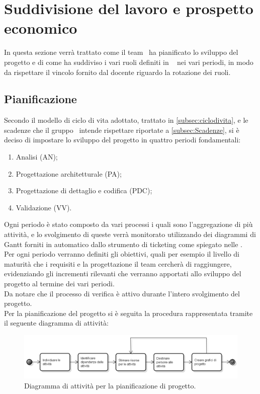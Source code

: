 \section{Suddivisione del lavoro e prospetto economico}
In questa sezione verrà trattato come il team \gruppo ~ha pianificato lo sviluppo del progetto e di come ha suddiviso i vari ruoli definiti in \NormeDiProgetto~ nei vari periodi, in modo da rispettare il vincolo fornito dal docente riguardo la rotazione dei ruoli.
\subsection{Pianificazione}
Secondo il modello di ciclo di vita adottato, trattato in \ref{subsec:ciclodivita}, e le scadenze che il gruppo \gruppo ~intende rispettare riportate a \ref{subsec:Scadenze}, si è deciso di impostare lo sviluppo del progetto in quattro periodi fondamentali:
\begin{enumerate}
	\item Analisi (AN);
	\item Progettazione architetturale (PA);
	\item Progettazione di dettaglio e codifica (PDC);
	\item Validazione (VV).
\end{enumerate}
Ogni periodo è stato composto da vari processi i quali sono l'aggregazione di più attività, e lo svolgimento di queste verrà monitorato utilizzando dei diagrammi di Gantt forniti in automatico dallo strumento di ticketing come spiegato nelle \infoNDP. \\
Per ogni periodo verranno definiti gli obiettivi, quali per esempio il livello di maturità che i requisiti e la progettazione il team cercherà di raggiungere, evidenziando gli incrementi rilevanti che verranno apportati allo sviluppo del progetto al termine dei vari periodi.\\
Da notare che il processo di verifica è attivo durante l'intero svolgimento del progetto.\\
Per la pianificazione del progetto si è seguita la procedura rappresentata tramite il seguente diagramma di attività:\\
\begin{figure}[H] \centering \includegraphics[width=%
\textwidth]
{../modello/img/pianificazione.png} \caption{Diagramma di attività per la pianificazione di progetto.}
\end{figure}
